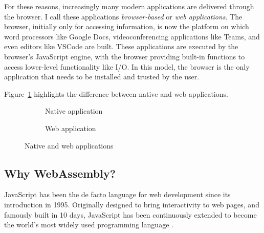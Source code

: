 For these reasons, increasingly many modern applications are delivered through the browser. I call these applications \emph{browser-based} or \emph{web applications}. The browser, initially only for accessing information, is now the platform on which word processors like Google Docs, videoconferencing applications like Teams, and even editors like VSCode are built. These applications are executed by the browser's JavaScript engine, with the browser providing built-in functions to access lower-level functionality like I/O. In this model, the browser is the only application that needs to be installed and trusted by the user.

Figure~\ref{fig:web-platform} highlights the difference between native and web applications.

\begin{figure}[H]
\centering
\begin{subfigure}{0.5\textwidth}
  \centering
\caption{Native application}
\end{subfigure}%
\begin{subfigure}{0.5\textwidth}
  \centering
\caption{Web application}
\end{subfigure}
\caption{Native and web applications}
\label{fig:web-platform}
\end{figure}
\vspace*{-2em}

\subsection{Why WebAssembly?}

JavaScript has been the de facto language for web development since its introduction in 1995. Originally designed to bring interactivity to web pages, and famously built in 10 days, JavaScript has been continuously extended to become the world's most widely used programming language \cite{wirfs-brockJavaScriptfirst202020a}.

